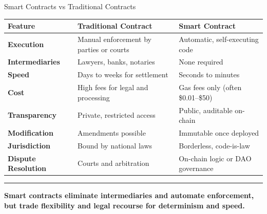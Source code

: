 \documentclass[8pt,aspectratio=169]{beamer}
\newcommand{\bottomnote}[1]{%
\vfill
\vspace{-2mm}
\textcolor{mllavender2}{\rule{\textwidth}{0.4pt}}
\vspace{1mm}
\footnotesize
\textbf{#1}
}
\begin{document}
\begin{frame}{Smart Contracts vs Traditional Contracts}
\vspace{2mm}
\begin{center}
\renewcommand{\arraystretch}{1.5}
\setlength{\tabcolsep}{6pt}
\begin{tabular}{@{}p{3.0cm}p{4.8cm}p{4.8cm}@{}}
\toprule
\textbf{\color{mlpurple}Feature} & \textbf{\color{mlblue}Traditional Contract} & \textbf{\color{mlgreen!70!black}Smart Contract} \\
\midrule
\textbf{Execution} & Manual enforcement by parties or courts & Automatic, self-executing code \\
\textbf{Intermediaries} & Lawyers, banks, notaries & None required \\
\textbf{Speed} & Days to weeks for settlement & Seconds to minutes \\
\textbf{Cost} & High fees for legal and processing & Gas fees only (often \$0.01--\$50) \\
\textbf{Transparency} & Private, restricted access & Public, auditable on-chain \\
\textbf{Modification} & Amendments possible & Immutable once deployed \\
\textbf{Jurisdiction} & Bound by national laws & Borderless, code-is-law \\
\textbf{Dispute Resolution} & Courts and arbitration & On-chain logic or DAO governance \\
\bottomrule
\end{tabular}
\end{center}
\bottomnote{Smart contracts eliminate intermediaries and automate enforcement, but trade flexibility and legal recourse for determinism and speed.}
\end{frame}
\end{document}
